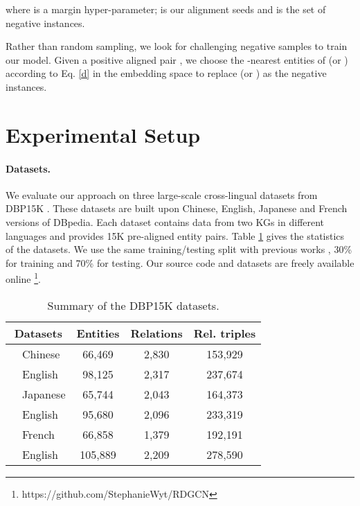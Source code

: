 \documentclass{article}
\begin{document}
where  is a margin hyper-parameter;  is our alignment seeds and  is the set of negative instances.

Rather than random sampling, we look for challenging negative samples to train our model.
Given a positive aligned pair , we choose the -nearest
entities of  (or ) according to Eq. \ref{d} in the embedding space to replace  (or ) as  the negative instances. 

\section{Experimental Setup}\label{setup}
\paragraph{Datasets.}
We evaluate our approach on three large-scale cross-lingual datasets from DBP15K \cite{sun2017cross}. These
datasets are built upon Chinese, English, Japanese and French versions of DBpedia. Each dataset contains data from two KGs in different
languages and provides 15K pre-aligned entity pairs. Table \ref{dataset} gives the statistics of the datasets.
We use the same training/testing split with previous works \cite{sun2018bootstrapping}, 30\% for training and 70\% for testing. Our source code and datasets are freely available online \footnote{https://github.com/StephanieWyt/RDGCN}.

\begin{table}[t!]
	\centering
	\scriptsize
	\begin{tabular}{l|l|ccc}
		\toprule
		\multicolumn{2}{c|}{\textbf{Datasets}} & \textbf{Entities} & \textbf{Relations} & \textbf{Rel. triples} \\
		\midrule
		\multirow{2}{*}{} & Chinese & 66,469 & 2,830 & 153,929 \\
		& English & 98,125 & 2,317 & 237,674  \\
		\midrule
		\multirow{2}{*}{} & Japanese & 65,744 & 2,043 & 164,373  \\
		& English & 95,680 & 2,096 & 233,319 \\
		\midrule
		\multirow{2}{*}{} & French & 66,858 & 1,379 & 192,191  \\
		& English & 105,889 & 2,209 & 278,590 \\
		\bottomrule
	\end{tabular}
	\caption{Summary of the DBP15K datasets.}
	\label{dataset}
	\vspace{-1mm}
\end{table}
\end{document}
